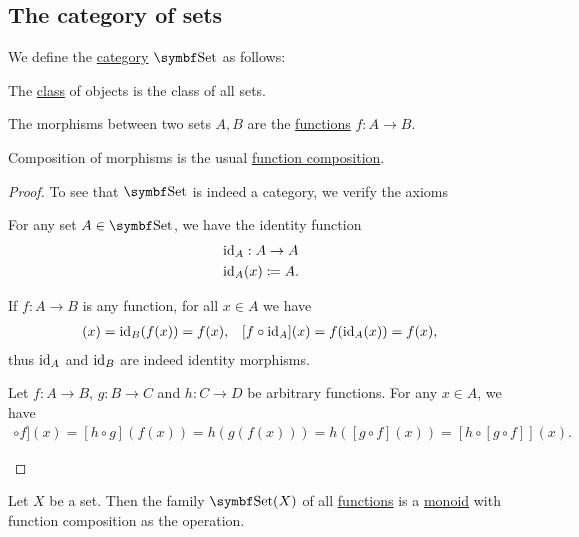 \subsection{The category of sets}\label{subsec:category_of_sets}

\begin{Definition}\label{def:category_of_sets}
  We define the \hyperref[def:category]{category} \( \Cat{Set} \) as follows:
  \begin{RefList}
     The \hyperref[def:set_zfc]{class} of objects is the class of all sets.

     The morphisms between two sets \( A, B \) are the \hyperref[def:function]{functions} \( f: A \to B \).

     Composition of morphisms is the usual \hyperref[def:function/composition]{function composition}.
  \end{RefList}
\end{Definition}
\begin{proof}
  To see that \( \Cat{Set} \) is indeed a category, we verify the axioms
  \begin{RefList}
     For any set \( A \in \Cat{Set} \), we have the identity function
    \begin{align*}
      &\operatorname{id}_A: A \to A \\
      &\operatorname{id}_A(x) \coloneqq A.
    \end{align*}

    If \( f: A \to B \) is any function, for all \( x \in A \) we have
    \begin{align*}
      [\Id_B \circ f](x) = \Id_B(f(x)) = f(x),
      &&
      [f \circ \Id_A](x) = f(\Id_A(x)) = f(x),
    \end{align*}
    thus \( \operatorname{id}_A \) and \( \operatorname{id}_B \) are indeed identity morphisms.

     Let \( f: A \to B \), \( g: B \to C \) and \( h: C \to D \) be arbitrary functions. For any \( x \in A \), we have
    \begin{align*}
      [[h \circ g] \circ f](x)
      =
      [h \circ g](f(x))
      =
      h(g(f(x)))
      =
      h([g \circ f](x))
      =
      [h \circ [g \circ f]](x).
    \end{align*}
  \end{RefList}
\end{proof}

\begin{Corollary}\label{thm:functions_over_set_form_monoid}
  Let \( X \) be a set. Then the family \( \Cat{Set}(X) \) of all \hyperref[remark:category_obj_hom]{functions} is a \hyperref[def:magma/monoid]{monoid} with function composition as the operation.
\end{Corollary}

